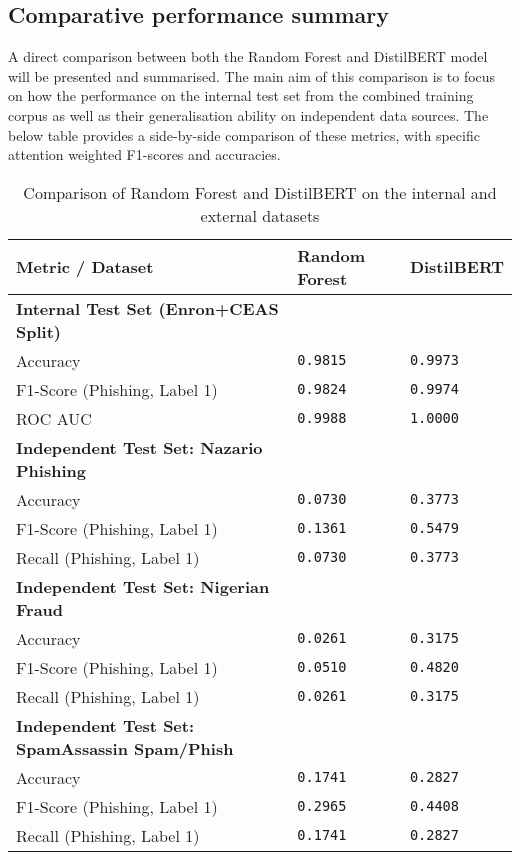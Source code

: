 
\subsection{Comparative performance summary}
A direct comparison between both the Random Forest and DistilBERT model will be presented and summarised. The main aim of this comparison is to focus on how the performance on the internal test set from the combined training corpus as well as their generalisation ability on independent data sources. The below table provides a side-by-side comparison of these metrics, with specific attention weighted F1-scores and accuracies.

\begin{table}[h]
\centering
\begin{tabularx}{\textwidth}{|X|X|X|}
\hline
\textbf{Metric / Dataset} & \textbf{Random Forest} & \textbf{DistilBERT} \\
\hline
\textbf{Internal Test Set (Enron+CEAS Split)} & & \\
\hline
Accuracy & \texttt{0.9815} & \texttt{0.9973} \\
F1-Score (Phishing, Label 1) & \texttt{0.9824} & \texttt{0.9974} \\
ROC AUC & \texttt{0.9988} & \texttt{1.0000} \\
\hline
\textbf{Independent Test Set: Nazario Phishing} & & \\
\hline
Accuracy & \texttt{0.0730} & \texttt{0.3773} \\
F1-Score (Phishing, Label 1) & \texttt{0.1361} & \texttt{0.5479} \\
Recall (Phishing, Label 1) & \texttt{0.0730} & \texttt{0.3773} \\
\hline
\textbf{Independent Test Set: Nigerian Fraud} & & \\
\hline
Accuracy & \texttt{0.0261} & \texttt{0.3175} \\
F1-Score (Phishing, Label 1) & \texttt{0.0510} & \texttt{0.4820} \\
Recall (Phishing, Label 1) & \texttt{0.0261} & \texttt{0.3175} \\
\hline
\textbf{Independent Test Set: SpamAssassin Spam/Phish} & & \\
\hline
Accuracy & \texttt{0.1741} & \texttt{0.2827} \\
F1-Score (Phishing, Label 1) & \texttt{0.2965} & \texttt{0.4408} \\
Recall (Phishing, Label 1) & \texttt{0.1741} & \texttt{0.2827} \\
\hline
\end{tabularx}
\caption{Comparison of Random Forest and DistilBERT on the internal and external datasets}
\end{table}

